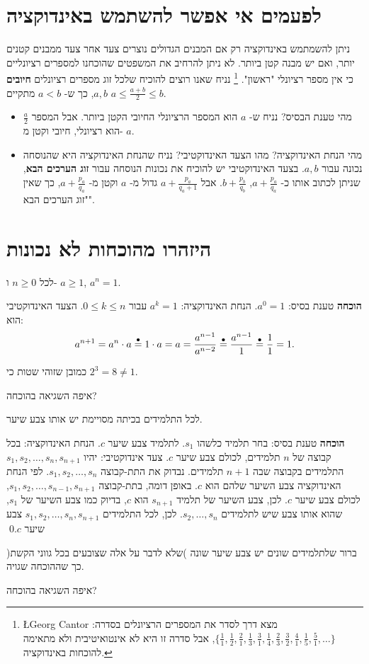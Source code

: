 \section{%
לפעמים אי אפשר להשתמש באינדוקציה%
}

ניתן להשמתמש באינדוקציה רק אם המבנים הגדולים נוצרים צעד אחר צעד ממבנים קטנים יותר, ואם יש מבנה קטן ביותר. לא ניתן להרחיב את המשפטים שהוכחנו למספרים רציונליים כי אין מספר רציונלי "ראשון".%
\footnote{%
\L{Georg Cantor}
מצא דרך לסדר את המספרים הרציונלים בסדרה: 
$\{\frac{1}{1},\frac{1}{2},\frac{2}{1},\frac{1}{3},\frac{3}{1},\frac{1}{4},\frac{2}{3},\frac{3}{2},\frac{4}{1},\frac{1}{5},\frac{5}{1},\ldots\}$,
אבל סדרה זו היא לא אינטואיטיבית ולא מתאימה להוכחות באינדוקציה.%
}
נניח שאנו רוצים להוכיח שלכל זוג מספרים רציונלים
\textbf{חיובים}
$a,b$,
כך ש-%
$a<b$
מתקיים
$a\leq \frac{a+b}{2} \leq b$.
\begin{itemize}
\item
מהי טענת הבסיס? נניח ש-%
$a$
הוא המספר הרציונלי החיובי הקטן ביותר. אבל המספר
$\frac{a}{2}$
הוא רציונלי, חיובי וקטן מ-%
$a$.
\item
מהי הנחת האינדוקציה? מהו הצעד האינדוקטיבי? נניח שהנחת האינדוקציה היא שהנוסחה נכונה עבור 
$a,b$.
בצעד האינדוקטיבי יש להוכיח את נכונות הנוסחה עבור
\textbf{זוג הערכים הבא},
שניתן לכתוב אותו כ-%
$a+\frac{p_a}{q_a}$, $b+\frac{p_b}{q_b}$.
אבל
$a+\frac{p_a}{q_a+1}$
גדול מ-%
$a$
וקטן מ-%
$a+\frac{p_a}{q_a}$,
כך שאין "זוג הערכים הבא".
\end{itemize}

\section{%
היזהרו מהוכחות לא נכונות%
}

\begin{theorem}
לכל
$n\geq 0$
ו-%
$a\geq 1$, $a^n=1$.
\end{theorem}

\textbf{הוכחה}
טענת בסיס:
$a^0=1$.
הנחת האינדוקציה:
$a^k=1$
עבור
$0\leq k\leq n$.
הצעד האינדוקטיבי הוא:
\[
a^{n+1}=a^n\cdot a \stackrel{\bullet}{=}{} 1\cdot a = a = \frac{a^{n-1}}{a^{n-2}} \stackrel{\bullet}{=}{} \frac{a^{n-1}}{1} \stackrel{\bullet}{=}{} \frac{1}{1} = 1.
\]


כמובן שזוהי שטות כי 
$2^3=8 \neq 1$.

\begin{exercise}
איפה השגיאה בהוכחה?
\end{exercise}

\begin{theorem}
לכל התלמידים בכיתה מסויימת יש אותו צבע שיער.
\end{theorem}
\textbf{הוכחה}
טענת בסיס: בחר תלמיד כלשהו
$s_1$.
לתלמיד צבע שיער
$c$.
הנחת האינדוקציה: בכל קבוצה של 
$n$
תלמידים, לכולם צבע שיער
$c$.
צעד אינדוקטיבי:
יהיו
$s_1,s_2,\ldots,s_n,s_{n+1}$
התלמידים בקבוצה שבה
$n+1$
תלמידים. נבדוק את התת-קבוצה 
$s_1,s_2,\ldots,s_n$.
לפי הנחת האינדוקציה צבע השיער שלהם הוא
$c$.
באופן דומה, בתת-קבוצה
$s_1,s_2,\ldots,s_{n-1},s_{n+1}$,
לכולם צבע שיער
$c$.
לכן, צבע השיער של תלמיד
$s_{n+1}$
הוא
$c$,
בדיוק כמו צבע השיער של
$s_1$,
שהוא אותו צבע שיש לתלמידים
$s_2,\ldots,s_n$.
לכן, לכל התלמידים
$s_1,s_2,\ldots,s_n,s_{n+1}$
צבע שיער
$c$.\qed

ברור שלתלמידים שונים יש צבע שיער שונה )שלא לדבר על אלה שצובעים בכל גווני הקשת( כך שההוכחה שגויה.

\begin{exercise}
איפה השגיאה בהוכחה?
\end{exercise}

